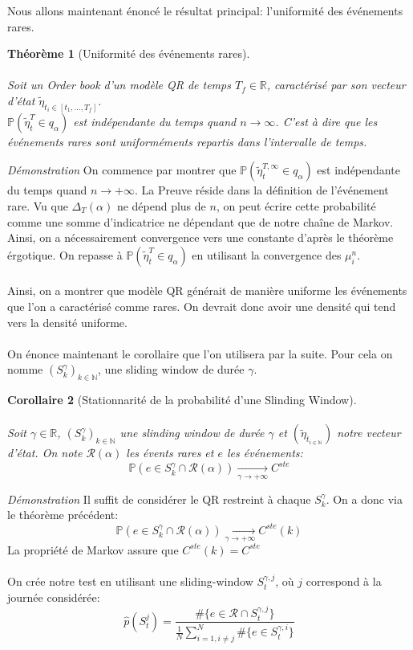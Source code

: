 \documentclass[12pt,a4paper]{article}
\newtheorem{theorem}{Théorème}[section]
\newtheorem{corollary}[theorem]{Corollaire}
\theoremstyle{definition}
\theoremstyle{remark}
\begin{document}
Nous allons maintenant énoncé le résultat principal: l'uniformité des événements rares.
\begin{theorem}[Uniformité des événements rares]
\\
\\
Soit un Order book d'un modèle QR de temps $T_f\in \mathbb{R}$, caractérisé par son vecteur d'état $\tilde \eta_{t_i\in [t_1,\dots,T_f]}$.
\\
$\mathbb{P}\left(\tilde\eta_t^T\in q_{\alpha}\right)$ est indépendante du temps quand $n\to\infty$. C'est à dire que les événements rares sont uniforméments repartis dans l'intervalle de temps.

\end{theorem}
\textit{Démonstration} On commence par montrer que $\mathbb{P}\left(\tilde\eta_t^{T,\infty}\in q_{\alpha}\right)$ est indépendante du temps quand $n\to+\infty$. La Preuve réside dans la définition de l'événement rare. Vu que $\Delta_T(\alpha)$ ne dépend plus de $n$, on peut écrire cette probabilité comme une somme d'indicatrice ne dépendant que de notre chaîne de Markov. Ainsi, on a nécessairement convergence vers une constante d'après le théorème érgotique. On repasse à $\mathbb{P}\left(\tilde\eta_t^T\in q_{\alpha}\right)$ en utilisant la convergence des $\mu_i^n$.
\\
\\
Ainsi, on a montrer que modèle QR générait de manière uniforme les événements que l'on a caractérisé comme rares. On devrait donc avoir une densité qui tend vers la densité uniforme. 
\\
\\
On énonce maintenant le corollaire que l'on utilisera par la suite. Pour cela on nomme $(S^\gamma_{k})_{k\in \mathbb{N}}$, une sliding window de durée $\gamma$.
\begin{corollary}[Stationnarité de la probabilité d'une Slinding Window] 
\\
\\
Soit $\gamma \in \mathbb{R}$, $(S^\gamma_{k})_{k\in \mathbb{N}}$ une slinding window de durée $\gamma$ et $(\tilde\eta_{t_{i\in \mathbb{N}}})$ notre vecteur d'état. On note $\mathcal{R}(\alpha)$ les évents rares et $e$ les événements:
$$\mathbb{P}\left(e\in S^{\gamma}_k \cap \mathcal{R}(\alpha)\right)\underset{\gamma\to+\infty}{\to}C^{ste}$$
\end{corollary}
\textit{Démonstration} Il suffit de considérer le QR restreint à chaque $S^{\gamma}_k$. On a donc via le théorème précédent:
$$\mathbb{P}\left(e\in S^{\gamma}_k \cap \mathcal{R}(\alpha)\right)\underset{\gamma\to+\infty}{\to}C^{ste}(k)$$
La propriété de Markov assure que $C^{ste}(k) = C^{ste}$
\\
\\
On crée notre test en utilisant une sliding-window $S_t^{\gamma,j}$, où $j$ correspond à la journée considérée:
$$\hat p(S_t^j) = \frac{\#\{e\in \mathcal{R}\cap S_t^{\gamma,j}\}}{\frac{1}{N}\sum_{i=1,i\neq j}^N\#\{e\in S_t^{\gamma,i}\}}$$
\\
\\
\end{document}
